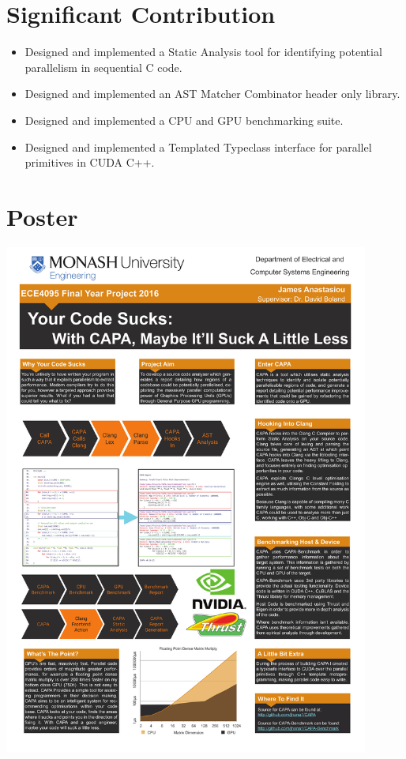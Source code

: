 
\section{Significant Contribution}

\begin{itemize}
\item Designed and implemented a Static Analysis tool for identifying potential parallelism in sequential C code.
\item Designed and implemented an AST Matcher Combinator header only library.
\item Designed and implemented a CPU and GPU benchmarking suite.
\item Designed and implemented a Templated Typeclass interface for parallel primitives in CUDA C++.
\end{itemize}

\section{Poster}
\includegraphics[width=0.9\textwidth]{./Pictures/Poster.png}
